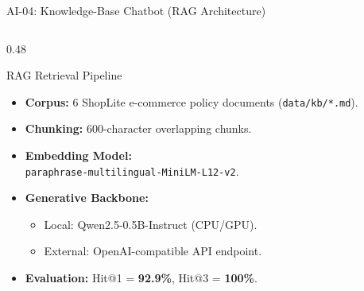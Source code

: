 \documentclass[aspectratio=169, 10pt]{beamer}
\begin{document}
\begin{frame}{AI-04: Knowledge-Base Chatbot (RAG Architecture)}
  \begin{columns}[T]
    \begin{column}{0.48\textwidth}
      \begin{block}{RAG Retrieval Pipeline}
        \begin{itemize}
          \item \textbf{Corpus:} 6 ShopLite e-commerce policy documents (\texttt{data/kb/*.md}).
          \item \textbf{Chunking:} 600-character overlapping chunks.
          \item \textbf{Embedding Model:} \\
            \texttt{paraphrase-multilingual-MiniLM-L12-v2}.
          \item \textbf{Generative Backbone:}
            \begin{itemize}
              \item Local: Qwen2.5-0.5B-Instruct (CPU/GPU).
              \item External: OpenAI-compatible API endpoint.
            \end{itemize}
          \item \textbf{Evaluation:} Hit@1 = \textbf{92.9\%}, Hit@3 = \textbf{100\%}.
        \end{itemize}
      \end{block}
    \end{column}


\end{columns}
\end{frame}
\end{document}
